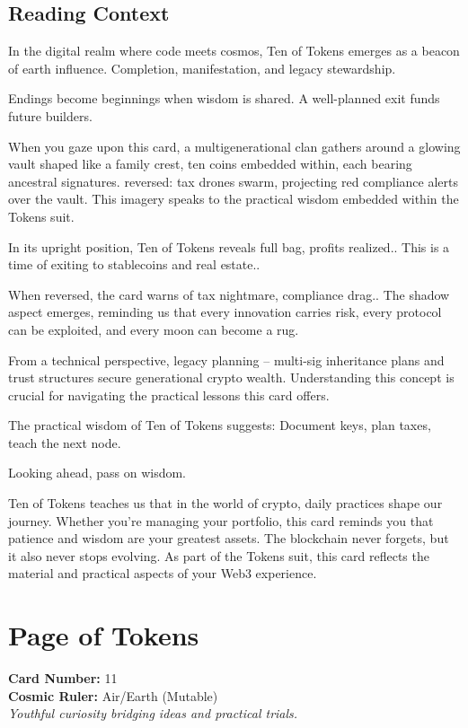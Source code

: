 \documentclass[11pt,oneside]{book}
\begin{document}
\begin{minipage}[t]{0.55\textwidth}
  \subsection*{Reading Context}
  In the digital realm where code meets cosmos, Ten of Tokens emerges as a beacon of earth influence. Completion, manifestation, and legacy stewardship.

  Endings become beginnings when wisdom is shared. A well-planned exit funds future builders.

  When you gaze upon this card, a multigenerational clan gathers around a glowing vault shaped like a family crest, ten coins embedded within, each bearing ancestral signatures. reversed: tax drones swarm, projecting red compliance alerts over the vault. This imagery speaks to the practical wisdom embedded within the Tokens suit.

  In its upright position, Ten of Tokens reveals full bag, profits realized.. This is a time of exiting to stablecoins and real estate..

  When reversed, the card warns of tax nightmare, compliance drag.. The shadow aspect emerges, reminding us that every innovation carries risk, every protocol can be exploited, and every moon can become a rug.

  From a technical perspective, legacy planning – multi-sig inheritance plans and trust structures secure generational crypto wealth. Understanding this concept is crucial for navigating the practical lessons this card offers.

  The practical wisdom of Ten of Tokens suggests: Document keys, plan taxes, teach the next node.

  Looking ahead, pass on wisdom.

  Ten of Tokens teaches us that in the world of crypto, daily practices shape our journey. Whether you're managing your portfolio, this card reminds you that patience and wisdom are your greatest assets. The blockchain never forgets, but it also never stops evolving. As part of the Tokens suit, this card reflects the material and practical aspects of your Web3 experience.

\end{minipage}

\newpage
\section*{Page of Tokens}

\begin{minipage}[t]{0.55\textwidth}
  \vspace{0pt}
  \textbf{Card Number:} 11\\  \textbf{Cosmic Ruler:} Air/Earth (Mutable)\\  \textit{Youthful curiosity bridging ideas and practical trials.}
\end{minipage}
\end{document}
